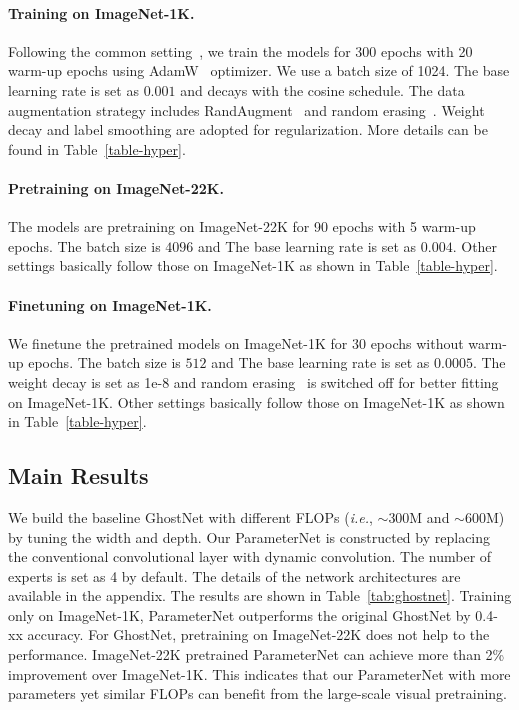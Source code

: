 \documentclass{article}
\newcommand{\ie}{\emph{i.e.}}
\begin{document}
\paragraph{Training on ImageNet-1K.}
Following the common setting~\cite{deit,swin,convnext}, we train the models for 300 epochs
with 20 warm-up epochs using AdamW~\cite{adamw} optimizer. We use a batch size of 1024. The base learning rate is set as $0.001$ and decays with the cosine schedule. The data augmentation strategy includes RandAugment~\cite{randaugment} and random erasing~\cite{erasing}. Weight decay and label smoothing are adopted for regularization. More details can be found in Table~\ref{table-hyper}.

\paragraph{Pretraining on ImageNet-22K.}
The models are pretraining on ImageNet-22K for 90 epochs with 5 warm-up epochs. The batch size is $4096$ and The base learning rate is set as $0.004$. Other settings basically follow those on ImageNet-1K as shown in Table~\ref{table-hyper}.

\paragraph{Finetuning on ImageNet-1K.}
We finetune the pretrained models on ImageNet-1K for 30 epochs without warm-up epochs. The batch size is $512$ and The base learning rate is set as $0.0005$. The weight decay is set as 1e-8 and random erasing~\cite{erasing} is switched off for better fitting on ImageNet-1K. Other settings basically follow those on ImageNet-1K as shown in Table~\ref{table-hyper}.

\subsection{Main Results}
We build the baseline GhostNet with different FLOPs (\ie, $\sim$300M and $\sim$600M) by tuning the width and depth. Our ParameterNet is constructed by replacing the conventional convolutional layer with dynamic convolution. The number of experts is set as 4 by default. The details of the network architectures are available in the appendix. The results are shown in Table~\ref{tab:ghostnet}. Training only on ImageNet-1K, ParameterNet outperforms the original GhostNet by 0.4-xx accuracy. For GhostNet, pretraining on ImageNet-22K does not help to the performance. ImageNet-22K pretrained ParameterNet can achieve more than 2\% improvement over ImageNet-1K. This indicates that our ParameterNet with more parameters yet similar FLOPs can benefit from the large-scale visual pretraining.
\end{document}
